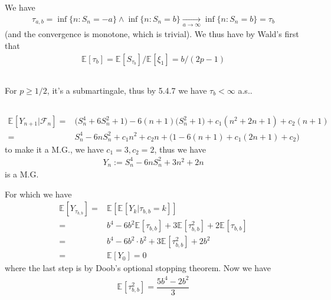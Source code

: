 \documentclass[11pt,a4paper]{ctexart}
\numberwithin{equation}{section}%
\newcommand{\F}{\mathcal{F}}
\begin{document}
\subsection{}

We have
\begin{align*}
    \tau_{a,b} = \inf\{n: S_n = -a\} \wedge \inf\{n: S_n = b\} \mathop{ \to }\limits_{a\to\infty} \inf\{n: S_n = b\} = \tau_b
\end{align*}
(and the convergence is monotone, which is trivial). We thus have by Wald's first that
\begin{align*}
    \mathbb{E}_{  }\left[ \tau_b \right] = \mathbb{E}_{  }\left[ S_{\tau_b} \right] / \mathbb{E}_{  }\left[ \xi _1 \right] = b/(2p-1)
\end{align*}

\subsection{}

For $ p \geq 1/2$, it's a submartingale, thus by 5.4.7 we have $ \tau_b<\infty  $ a.s..

\subsection{}


\begin{align*}
    \mathbb{E}_{  }\left[ Y_{n+1}|\F_n \right]  =& \big( S_{n}^4 + 6S_{n}^2 +  1 \big) - 6(n+1)\big( S_n^2 + 1 \big) + c_1(n^2 + 2n + 1) + c_2(n+1)\\
    =& S_{n}^4 -6nS_n^2 + c_1n^2 + c_2n + \big( 1-6(n+1) + c_1(2n+1) + c_2 \big)
\end{align*}
to make it a M.G., we have $ c_1=3, c_2=2 $, thus we have
\begin{align*}
    Y_n:= S_n^4 -6nS_n^2 + 3n^2 + 2n 
\end{align*}
is a M.G. 

For which we have
\begin{align*}
    \mathbb{E}_{  }\left[ Y_{\tau_{b,b}} \right]=& \mathbb{E}_{  }\left[ \mathbb{E}_{  }\left[ Y_{k} | \tau_{b,b}=k \right]  \right] \\
    =& b^4 - 6b^2\mathbb{E}_{  }\left[ \tau_{b,b} \right] + 3\mathbb{E}_{  }\left[ \tau_{b,b}^2 \right] + 2\mathbb{E}_{  }\left[ \tau_{b,b} \right] \\ 
    =& b^4 -6b^2\cdot b^2 + 3\mathbb{E}_{  }\left[ \tau_{b,b}^2 \right] + 2b^2\\
    =&\mathbb{E}_{  }\left[ Y_0 \right] = 0 
\end{align*}
where the last step is by Doob's optional stopping theorem. Now we have
\begin{align*}
    \mathbb{E}_{  }\left[ \tau_{b,b} ^2\right]  = \dfrac{ 5b^4 - 2b^2 }{ 3 }  
\end{align*}
\end{document}
